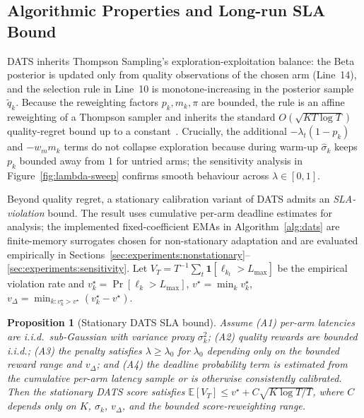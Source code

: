 \documentclass[final,3p,twocolumn,authoryear]{elsarticle}
\theoremstyle{plain}
\newtheorem{proposition}{Proposition}
\theoremstyle{definition}
\begin{document}
\subsection{Algorithmic Properties and Long-run SLA Bound}
\label{sec:method:theory}

DATS inherits Thompson Sampling's exploration-exploitation balance: the Beta posterior is updated only from quality observations of the chosen arm (Line~14), and the selection rule in Line~10 is monotone-increasing in the posterior sample $\tilde{q}_k$. Because the reweighting factors $p_k, m_k, \pi$ are bounded, the rule is an affine reweighting of a Thompson sampler and inherits the standard $O(\sqrt{KT\log T})$ quality-regret bound up to a constant~\citep{agrawal2012analysis,russo2018tutorial,lattimore2020bandit}. Crucially, the additional $-\lambda_t(1-p_k)$ and $-w_m m_k$ terms do not collapse exploration because during warm-up $\hat{\sigma}_k$ keeps $p_k$ bounded away from $1$ for untried arms; the sensitivity analysis in Figure~\ref{fig:lambda-sweep} confirms smooth behaviour across $\lambda\in[0,1]$.

Beyond quality regret, a stationary calibration variant of DATS admits an \emph{SLA-violation} bound. The result uses cumulative per-arm deadline estimates for analysis; the implemented fixed-coefficient EMAs in Algorithm~\ref{alg:dats} are finite-memory surrogates chosen for non-stationary adaptation and are evaluated empirically in Sections~\ref{sec:experiments:nonstationary}--\ref{sec:experiments:sensitivity}. Let $V_T{=}T^{-1}\sum_{t}\mathbf{1}[\ell_{k_t}{>}L_{\max}]$ be the empirical violation rate and $v_k^\star{=}\Pr[\ell_k{>}L_{\max}]$, $v^\star{=}\min_k v_k^\star$, $v_\Delta{=}\min_{k:v_k^\star{>}v^\star}(v_k^\star{-}v^\star)$.

\begin{proposition}[Stationary DATS SLA bound]
\label{prop:dats-sla}
Assume (A1) per-arm latencies are i.i.d.\ sub-Gaussian with variance proxy $\sigma_k^2$; (A2) quality rewards are bounded i.i.d.; (A3) the penalty satisfies $\lambda\geq\lambda_0$ for $\lambda_0$ depending only on the bounded reward range and $v_\Delta$; and (A4) the deadline probability term is estimated from the cumulative per-arm latency sample or is otherwise consistently calibrated. Then the stationary DATS score satisfies
$\mathbb{E}[V_T] \leq v^\star + C\sqrt{K\log T / T}$,
where $C$ depends only on $K$, $\sigma_k$, $v_\Delta$, and the bounded score-reweighting range.
\end{proposition}
\end{document}
